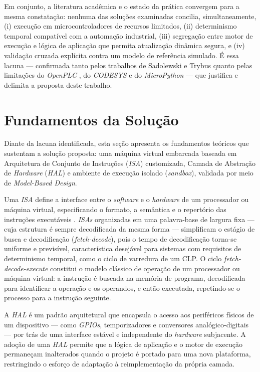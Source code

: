 Em conjunto, a literatura acadêmica e o estado da prática convergem para a mesma constatação: nenhuma das soluções examinadas concilia, simultaneamente, (i) execução em microcontroladores de recursos limitados, (ii) determinismo temporal compatível com a automação industrial, (iii) segregação entre motor de execução e lógica de aplicação que permita atualização dinâmica segura, e (iv) validação cruzada explícita contra um modelo de referência simulado.
É essa lacuna --- confirmada tanto pelos trabalhos de Sadolewski e Trybus \cite{sadolewski:2022,sadolewski:2024} quanto pelas limitações do \textit{OpenPLC} \cite{openplc:2025}, do \textit{CODESYS} \cite{codesys:2025} e do \textit{MicroPython} \cite{micropython:2025} --- que justifica e delimita a proposta deste trabalho.


\section{Fundamentos da Solução}
\label{sec:fundamentos-solucao}

Diante da lacuna identificada, esta seção apresenta os fundamentos teóricos que sustentam a solução proposta: uma máquina virtual embarcada baseada em Arquitetura de Conjunto de Instruções (\textit{ISA}) customizada, Camada de Abstração de \textit{Hardware} (\textit{HAL}) e ambiente de execução isolado (\textit{sandbox}), validada por meio de \textit{Model-Based Design}.

Uma \textit{ISA} define a interface entre o \textit{software} e o \textit{hardware} de um processador ou máquina virtual, especificando o formato, a semântica e o repertório das instruções executáveis \cite{patterson:2020}.
\textit{ISAs} organizadas em uma palavra-base de largura fixa --- cuja estrutura é sempre decodificada da mesma forma --- simplificam o estágio de busca e decodificação (\textit{fetch-decode}), pois o tempo de decodificação torna-se uniforme e previsível, característica desejável para sistemas com requisitos de determinismo temporal, como o ciclo de varredura de um CLP.
O ciclo \textit{fetch-decode-execute} constitui o modelo clássico de operação de um processador ou máquina virtual: a instrução é buscada na memória de programa, decodificada para identificar a operação e os operandos, e então executada, repetindo-se o processo para a instrução seguinte.

A \textit{HAL} é um padrão arquitetural que encapsula o acesso aos periféricos físicos de um dispositivo --- como \textit{GPIOs}, temporizadores e conversores analógico-digitais --- por trás de uma interface estável e independente do \textit{hardware} subjacente.
A adoção de uma \textit{HAL} permite que a lógica de aplicação e o motor de execução permaneçam inalterados quando o projeto é portado para uma nova plataforma, restringindo o esforço de adaptação à reimplementação da própria camada.


